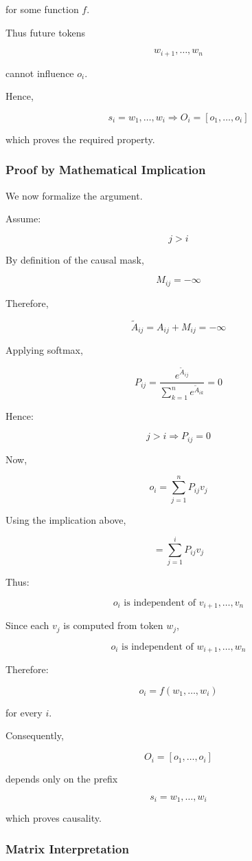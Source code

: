 \documentclass[12pt]{article}
\begin{document}
for some function \(f\).

Thus future tokens

\[
w_{i+1},\dots,w_n
\]

cannot influence \(o_i\).

Hence,

\[
s_i = w_1,\dots,w_i
\Longrightarrow
O_i=[o_1,\dots,o_i]
\]

which proves the required property.

\subsubsection*{Proof by Mathematical Implication}

We now formalize the argument.

Assume:

\[
j>i
\]

By definition of the causal mask,

\[
M_{ij}=-\infty
\]

Therefore,

\[
\widetilde A_{ij}
=
A_{ij}+M_{ij}
=
-\infty
\]

Applying softmax,

\[
P_{ij}
=
\frac{e^{\widetilde A_{ij}}}
{\sum_{k=1}^n e^{\widetilde A_{ik}}}
=
0
\]

Hence:

\[
j>i
\Longrightarrow
P_{ij}=0
\]

Now,

\[
o_i
=
\sum_{j=1}^n P_{ij}v_j
\]

Using the implication above,

\[
=
\sum_{j=1}^i P_{ij}v_j
\]

Thus:

\[
o_i
\text{ is independent of }
v_{i+1},\dots,v_n
\]

Since each \(v_j\) is computed from token \(w_j\),

\[
o_i
\text{ is independent of }
w_{i+1},\dots,w_n
\]

Therefore:

\[
o_i
=
f(w_1,\dots,w_i)
\]

for every \(i\).

Consequently,

\[
O_i=[o_1,\dots,o_i]
\]

depends only on the prefix

\[
s_i=w_1,\dots,w_i
\]

which proves causality.

\subsubsection*{Matrix Interpretation}
\end{document}
